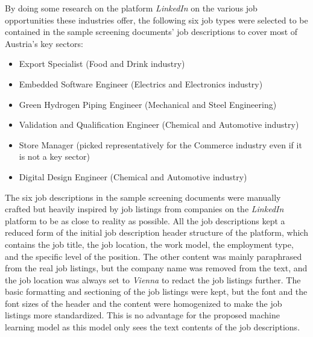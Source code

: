 \documentclass[draft,final]{thesisclass} %
\begin{document}
By doing some research on the platform \textit{LinkedIn} \parencite{linkedin} on the various job opportunities these industries offer, the following six job types were selected to be contained in the sample screening documents' job descriptions to cover most of Austria's key sectors:
\begin{itemize}
    \item Export Specialist (Food and Drink industry)
    \item Embedded Software Engineer (Electrics and Electronics industry)
    \item Green Hydrogen Piping Engineer (Mechanical and Steel Engineering)
    \item Validation and Qualification Engineer (Chemical and Automotive industry)
    \item Store Manager (picked representatively for the Commerce industry even if it is not a key sector)
    \item Digital Design Engineer (Chemical and Automotive industry)
\end{itemize}
The six job descriptions in the sample screening documents were manually crafted but heavily inspired by job listings from companies on the \textit{LinkedIn} platform to be as close to reality as possible.
All the job descriptions kept a reduced form of the initial job description header structure of the platform, which contains the job title, the job location, the work model, the employment type, and the specific level of the position.
The other content was mainly paraphrased from the real job listings, but the company name was removed from the text, and the job location was always set to \textit{Vienna} to redact the job listings further.
The basic formatting and sectioning of the job listings were kept, but the font and the font sizes of the header and the content were homogenized to make the job listings more standardized.
This is no advantage for the proposed machine learning model as this model only sees the text contents of the job descriptions.
\end{document}
